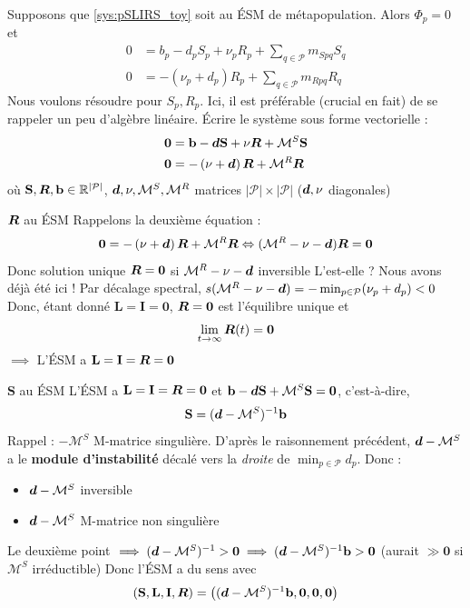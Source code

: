 \documentclass[aspectratio=169]{beamer}\usepackage[]{graphicx}\usepackage[]{xcolor}
\begin{document}
\begin{frame}{}
Supposons que \eqref{sys:pSLIRS_toy} soit au ÉSM de métapopulation. Alors $\Phi_p=0$ et 
\begin{align*}
0 &=b_p-d_pS_p+\nu_pR_p
+\textstyle{\sum_{q\in\mathcal{P}}} m_{Spq}S_{q} \\
0 &=-\left(\nu_{p}+d_{p}\right)R_{p}
+\textstyle{\sum_{q\in\mathcal{P}}} m_{Rpq}R_{q}
\end{align*}
Nous voulons résoudre pour $S_p,R_p$. Ici, il est préférable (crucial en fait) de se rappeler un peu d'algèbre linéaire. Écrire le système sous forme vectorielle :
\begin{align*}
\mathbf{0} &=\mathbf{b}-\bm{d}\mathbf{S}+\mathbf{\nu}\bm{R}+\mathcal{M}^S\mathbf{S} \\
\mathbf{0} &=-\left(\mathbf{\nu}+\bm{d}\right)\bm{R}+\mathcal{M}^R\bm{R}
\end{align*}
où $\mathbf{S},\bm{R},\mathbf{b}\in\mathbb{R}^{|\mathcal{P}|}$, $\bm{d},\mathbf{\nu},\mathcal{M}^S,\mathcal{M}^R$ matrices $|\mathcal{P}|\times|\mathcal{P}|$ ($\bm{d},\mathbf{\nu}$ diagonales)
\end{frame}

\begin{frame}{$\bm{R}$ au ÉSM}
Rappelons la deuxième équation :
$$
\mathbf{0} =-\left(\mathbf{\nu}+\bm{d}\right)\bm{R}+\mathcal{M}^R\bm{R} \Leftrightarrow (\mathcal{M}^R-\mathbf{\nu}-\bm{d})\bm{R}=\mathbf{0}
$$
\vfill
Donc solution unique $\bm{R}=\mathbf{0}$ si $\mathcal{M}^R-\mathbf{\nu}-\bm{d}$ inversible
L'est-elle ?
\vfill
Nous avons déjà été ici ! 
\vfill
Par décalage spectral, $s(\mathcal{M}^R-\mathbf{\nu}-\bm{d})=-\min_{p\in\mathcal{P}}(\nu_p+d_p)<0$
\vfill
Donc, étant donné $\mathbf{L}=\mathbf{I}=\mathbf{0}$, $\bm{R}=\mathbf{0}$ est l'équilibre unique et
$$
\lim_{t\to\infty}\bm{R}(t)=\mathbf{0}
$$
\vfill
$\implies$ L'ÉSM a $\mathbf{L}=\mathbf{I}=\bm{R}=\mathbf{0}$
\end{frame}


\begin{frame}{$\mathbf{S}$ au ÉSM}
L'ÉSM a $\mathbf{L}=\mathbf{I}=\bm{R}=\mathbf{0}$ et $\mathbf{b}-\bm{d}\mathbf{S}+\mathcal{M}^S\mathbf{S}=\mathbf{0}$, c'est-à-dire,
$$
\mathbf{S}=(\bm{d}-\mathcal{M}^S)^{-1}\mathbf{b}
$$
\vfill
Rappel : $-\mathcal{M}^S$ M-matrice singulière. D'après le raisonnement précédent, $\bm{d}-\mathcal{M}^S$ a le \textbf{module d'instabilité} décalé vers la \emph{droite} de $\min_{p\in\mathcal{P}}d_p$. Donc :
\begin{itemize}
\item $\bm{d}-\mathcal{M}^S$ inversible
\item $\bm{d}-\mathcal{M}^S$ M-matrice non singulière
\end{itemize}
\vfill
Le deuxième point $\implies (\bm{d}-\mathcal{M}^S)^{-1}>\mathbf{0}\implies (\bm{d}-\mathcal{M}^S)^{-1}\mathbf{b}> \mathbf{0}$ (aurait $\gg\mathbf{0}$ si $\mathcal{M}^S$ irréductible)
\vfill
Donc l'ÉSM a du sens avec
$$
(\mathbf{S},\mathbf{L},\mathbf{I},\bm{R})=\left((\bm{d}-\mathcal{M}^S)^{-1}\mathbf{b},\mathbf{0},\mathbf{0},\mathbf{0}\right)
$$
\end{frame}
\end{document}
